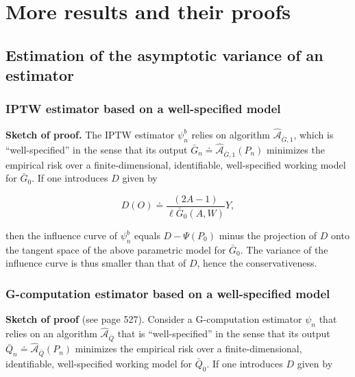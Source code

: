 \documentclass[
  11pt,
  openright,twoside]{book}
\newcommand{\Algo}{\widehat{\mathcal{A}}}
\newcommand{\defq}{\doteq}
\newcommand{\Gbar}{\bar{G}}
\newcommand{\Qbar}{\bar{Q}}
\theoremstyle{definition}
\theoremstyle{definition}
\theoremstyle{definition}
\theoremstyle{definition}
\theoremstyle{remark}
\begin{document}
\hypertarget{more-proofs}{%
\chapter{More results and their proofs}\label{more-proofs}}

\hypertarget{estimation-of-the-asymptotic-variance-of-an-estimator}{%
\section{Estimation of the asymptotic variance of an estimator}\label{estimation-of-the-asymptotic-variance-of-an-estimator}}

\hypertarget{iptw-est-var}{%
\subsection{IPTW estimator based on a well-specified model}\label{iptw-est-var}}

\textbf{Sketch of proof.} The IPTW estimator \(\psi_{n}^{b}\) relies on algorithm
\(\Algo_{\Gbar,1}\), which is ``well-specified'' in the
sense that its output \(\Gbar_{n}\defq \Algo_{\Gbar,1}(P_{n})\) minimizes the
empirical risk over a finite-dimensional, identifiable, well-specified working
model for \(\Gbar_{0}\). If one introduces \(D\) given by

\begin{equation*}
D(O) \defq \frac{(2A-1)}{\ell\Gbar_{0}(A,W)} Y,
\end{equation*}

then the influence curve of \(\psi_{n}^{b}\) equals \(D - \Psi(P_{0})\) minus the
projection of \(D\) onto the tangent space of the above parametric model for
\(\Gbar_{0}\). The variance of the influence curve is thus smaller than that of
\(D\), hence the conservativeness.

\hypertarget{gcomp-est-var}{%
\subsection{G-computation estimator based on a well-specified model}\label{gcomp-est-var}}

\textbf{Sketch of proof} (see \citep{TMLEbook11} page 527). Consider a G-computation
estimator \(\psi_{n}\) that relies on an algorithm \(\Algo_{\Qbar}\) that is
``well-specified'' in the sense that its output
\(\Qbar_{n}\defq \Algo_{\Qbar}(P_{n})\) minimizes the empirical risk over a
finite-dimensional, identifiable, well-specified working model for
\(\Qbar_{0}\). If one introduces \(D\) given by
\end{document}
